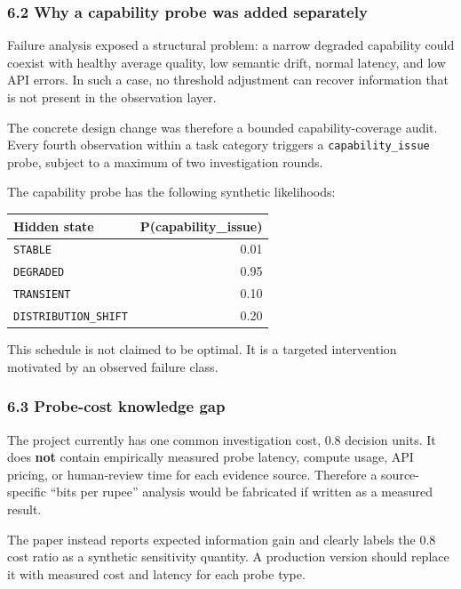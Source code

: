 \documentclass[
]{article}
\begin{document}
\subsubsection{6.2 Why a capability probe was added
separately}\label{why-a-capability-probe-was-added-separately}

Failure analysis exposed a structural problem: a narrow degraded
capability could coexist with healthy average quality, low semantic
drift, normal latency, and low API errors. In such a case, no threshold
adjustment can recover information that is not present in the
observation layer.

The concrete design change was therefore a bounded capability-coverage
audit. Every fourth observation within a task category triggers a
\texttt{capability\_issue} probe, subject to a maximum of two
investigation rounds.

The capability probe has the following synthetic likelihoods:

\begin{longtable}[]{@{}lr@{}}
\toprule\noalign{}
Hidden state & P(capability\_issue) \\
\midrule\noalign{}
\endhead
\bottomrule\noalign{}
\endlastfoot
\texttt{STABLE} & 0.01 \\
\texttt{DEGRADED} & 0.95 \\
\texttt{TRANSIENT} & 0.10 \\
\texttt{DISTRIBUTION\_SHIFT} & 0.20 \\
\end{longtable}

This schedule is not claimed to be optimal. It is a targeted
intervention motivated by an observed failure class.

\subsubsection{6.3 Probe-cost knowledge
gap}\label{probe-cost-knowledge-gap}

The project currently has one common investigation cost, 0.8 decision
units. It does \textbf{not} contain empirically measured probe latency,
compute usage, API pricing, or human-review time for each evidence
source. Therefore a source-specific ``bits per rupee'' analysis would be
fabricated if written as a measured result.

The paper instead reports expected information gain and clearly labels
the 0.8 cost ratio as a synthetic sensitivity quantity. A production
version should replace it with measured cost and latency for each probe
type.
\end{document}
